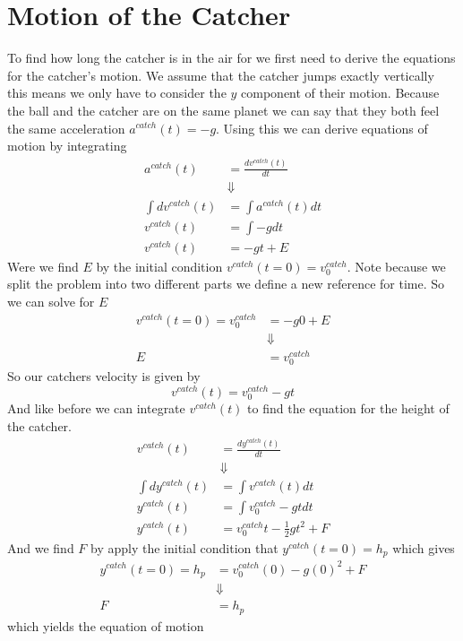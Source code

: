 \documentclass[11pt]{article}
\begin{document}
\section{Motion of the Catcher}
To find how long the catcher is in the air for we first need to derive the equations for 
the catcher's motion. We assume that the catcher jumps exactly vertically this means we only 
have to consider the $y$ component of their motion. Because the ball and the catcher are on 
the same planet we can say that they both feel the same acceleration $a^{catch}(t) = -g$.
Using this we can derive equations of motion by integrating
\begin{align*}
a^{catch}(t) &= \frac{dv^{catch}(t)}{dt}\\
&\Downarrow\\
\int dv^{catch}(t) &= \int a^{catch}(t)dt\\
v^{catch}(t) &= \int -gdt\\
v^{catch}(t) &= -gt + E
\end{align*}
Were we find $E$ by the initial condition $v^{catch}(t=0) = v^{catch}_0$. Note because we split the
problem into two different parts we define a new reference for time. So we can solve for $E$
\begin{align*}
v^{catch}(t=0) = v^{catch}_0 &= -g0 + E\\
&\Downarrow\\
E &= v^{catch}_0
\end{align*}
So our catchers velocity is given by
\begin{equation}
v^{catch}(t) = v^{catch}_0 - gt
\label{VCatch}
\end{equation}
And like before we can integrate $v^{catch}(t)$ to find the equation for the height of the 
catcher.
\begin{align*}
v^{catch}(t) &= \frac{dy^{catch}(t)}{dt}\\
&\Downarrow\\
\int dy^{catch}(t) &= \int v^{catch}(t)dt\\
y^{catch}(t) &= \int v^{catch}_0-gtdt\\
y^{catch}(t) &= v^{catch}_0t-\frac{1}{2}gt^2+F
\end{align*}
And we find $F$ by apply the initial condition that $y^{catch}(t=0) = h_p$ which gives
\begin{align*}
y^{catch}(t=0) = h_p &= v^{catch}_0(0)-g(0)^2+F\\
&\Downarrow\\
F &= h_p
\end{align*}
which yields the equation of motion 
\end{document}
